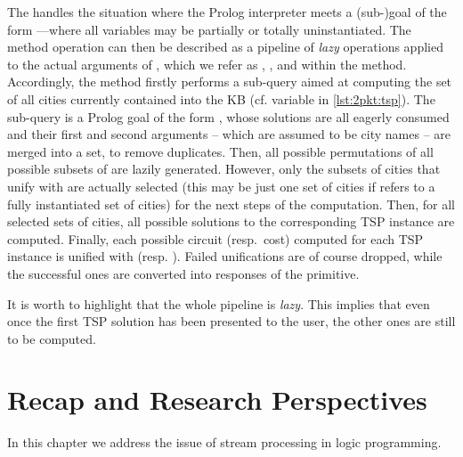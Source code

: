 \documentclass[12pt,a4paper,openright,twoside]{book}
\begin{document}
The  handles the situation where the Prolog interpreter meets a (sub-)goal of the form ---where all variables may be partially or totally uninstantiated.
%
The method operation can then be described as a pipeline of \emph{lazy} operations applied to the actual arguments of , which we refer as , , and  within the method.
%
Accordingly, the method firstly performs a sub-query aimed at computing the set of all cities currently contained into the KB (cf. variable  in \cref{lst:2pkt:tsp}).
%
The sub-query is a Prolog goal of the form , whose solutions are all eagerly consumed and their first and second arguments -- which are assumed to be city names -- are merged into a set, to remove duplicates.
%
Then, all possible permutations of all possible subsets of  are lazily generated.
%
However, only the subsets of cities that unify with  are actually selected (this may be just one set of cities if  refers to a fully instantiated set of cities) for the next steps of the computation.
%
Then, for all selected sets of cities, all possible solutions to the corresponding TSP instance are computed.
%
Finally, each possible circuit (resp.\ cost) computed for each TSP instance is unified with  (resp. ).
%
Failed unifications are of course dropped, while the successful ones are converted into responses of the  primitive.

It is worth to highlight that the whole pipeline is \emph{lazy}.
%
This implies that even once the first TSP solution has been presented to the user, the other ones are still to be computed.

\section{Recap and Research Perspectives}


In this chapter we address the issue of stream processing in logic programming.
\end{document}

